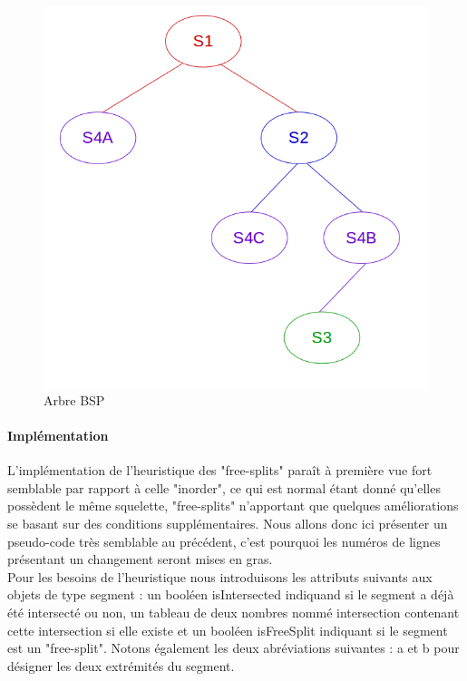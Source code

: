 \documentclass[11pt,a4paper]{article}
\theoremstyle{definition}
\theoremstyle{remark}
\begin{document}
\begin{figure}[!h]
\centering
\includegraphics[scale=0.4]{free_splits_3.png}
\caption{Arbre BSP}
\label{split_bsp}
\end{figure}

\paragraph{Implémentation}

L'implémentation de l'heuristique des "free-splits" paraît à première vue fort semblable par rapport à celle "inorder", ce qui est normal étant donné qu'elles possèdent le même squelette, "free-splits" n'apportant que quelques améliorations se basant sur des conditions supplémentaires. Nous allons donc ici présenter un pseudo-code très semblable au précédent, c'est pourquoi les numéros de lignes présentant un changement seront mises en gras.\\

Pour les besoins de l'heuristique nous introduisons les attributs suivants aux objets de type segment : un booléen isIntersected indiquand si le segment a déjà été intersecté ou non, un tableau de deux nombres nommé intersection contenant cette intersection si elle existe et un booléen isFreeSplit indiquant si le segment est un "free-split". Notons également les deux abréviations suivantes : a et b pour désigner les deux extrémités du segment.\\
\end{document}
